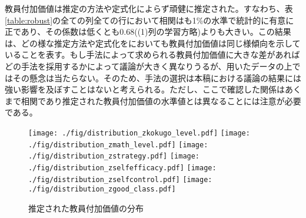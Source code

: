 \documentclass[a4paper,12pt]{article}
\begin{document}
教員付加価値は推定の方法や定式化によらず頑健に推定された。すなわち、表\ref{table:robust}の全ての列全ての行において相関はも1\%の水準で統計的に有意に正であり、その係数は低くとも0.68((1)列の学習方略)よりも大きい。この結果は、どの様な推定方法や定式化をにおいても教員付加価値は同じ様傾向を示していることを表す。もし手法によって求められる教員付加価値に大きな差があればどの手法を採用するかによって議論が大きく異なりうるが、用いたデータの上ではその懸念は当たらない。そのため、手法の選択は本稿における議論の結果には強い影響を及ぼすことはないと考えられる。ただし、ここで確認した関係はあくまで相関であり推定された教員付加価値の水準値とは異なることには注意が必要である。



\begin{figure}
\centering
\texttt{[image: ./fig/distribution\_zkokugo\_level.pdf]}
\texttt{[image: ./fig/distribution\_zmath\_level.pdf]}
\texttt{[image: ./fig/distribution\_zstrategy.pdf]}
\texttt{[image: ./fig/distribution\_zselfefficacy.pdf]}
\texttt{[image: ./fig/distribution\_zselfcontrol.pdf]}
\texttt{[image: ./fig/distribution\_zgood\_class.pdf]}
\label{fig:decompose}
\caption{推定された教員付加価値の分布}
\end{figure}
\end{document}
